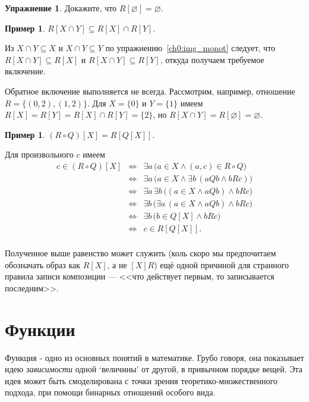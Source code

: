 \documentclass[12pt,notitlepage]{article}
\theoremstyle{plain}
\theoremstyle{definition}
\newtheorem{exc}[thm]{Упражнение}
\newtheorem{exm}[thm]{Пример}
\theoremstyle{plain}
\newcommand{\sbs}{\subseteq}
\newcommand{\void}{\varnothing}
\newcommand{\1}{\mathbf{1}}
\newcommand{\0}{\mathbf{0}}
\begin{document}
\begin{exc}
	Докажите, что $R[\void] = \void$.
\end{exc}

\begin{exm}\label{ch0:exm25}
	$R[X \cap Y] \sbs R[X] \cap R[Y]$.
	
	Из $X \cap Y \sbs X$ и $X \cap Y \sbs Y$ по упражнению~\ref{ch0:img_monot} следует, что $R[X \cap Y] \sbs R[X]$ и $R[X \cap Y] \sbs R[Y]$, откуда получаем требуемое включение.
	
	Обратное включение выполняется не всегда. Рассмотрим, например, отношение $R = \{(0,2), (1,2)\}$. Для $X = \{0\}$ и $Y = \{1\}$ имеем $R[X] = R[Y] = R[X] \cap R[Y]  = \{2\}$, но $R[X \cap Y] = R[\void] = \void$.
\end{exm}

\begin{exm}
	$(R \circ Q)[X] = R[Q[X]]$.
	
	Для произвольного $c$ имеем
	$$
	\begin{array}{rcl}
		c \in (R \circ Q)[X] &\iff& \exists a\, \bigl( a \in X \wedge (a,c) \in R \circ Q \bigr)\\
		&\iff& \exists a\, \bigl( a \in X \wedge \exists b\, ( a Q b \wedge b R c) \bigr)\\
		&\iff& \exists a\, \exists b\,\bigl( (a \in X \wedge a Q b) \wedge b R c \bigr)\\
		&\iff& \exists b\, \bigl( \exists a\, (a \in X \wedge a Q b) \wedge b R c \bigr)\\
		&\iff& \exists b\, \bigl( b \in Q[X] \wedge b R c \bigr)\\
		&\iff& c \in R[Q[X]].\\
	\end{array}
	$$
\end{exm}
Полученное выше равенство может служить (коль скоро мы предпочитаем обозначать образ как $R[X]$, а не $[X]R$) ещё одной причиной для странного правила записи композиции --- <<что действует первым, то записывается последним>>.

\section{Функции}
Функция - одно из основных понятий в математике. Грубо говоря, она показывает идею \emph{зависимости} одной `величины' от другой, в привычном порядке вещей. Эта идея может быть смоделирована с точки зрения теоретико-множественного подхода, при помощи бинарных отношений особого вида.
\end{document}
